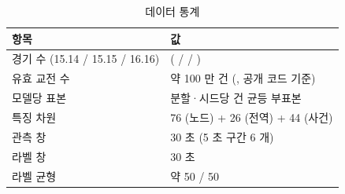 \begin{table}[htbp]
  \centering
  \caption{데이터 통계}
  \label{tab:data}
  \small
  \begin{tabular}{@{}ll@{}}
    \toprule
    항목 & 값 \\
    \midrule
    경기 수 (15.14 / 15.15 / 16.16) & \numMatches{} (\numMatchesPatchA{} / \numMatchesPatchB{} / \numMatchesPatchC{}) \\
    유효 교전 수 & 약 100 만 건 (\numEngagementsCorrected{}, 공개 코드 기준) \\
    모델당 표본 & 분할·시드당 \numSubsample{} 건 균등 부표본 \\
    특징 차원 & 76 (노드) + 26 (전역) + 44 (사건) \\
    관측 창 & 30 초 (5 초 구간 6 개) \\
    라벨 창 & 30 초 \\
    라벨 균형 & 약 50 / 50 \\
    \bottomrule
  \end{tabular}
\end{table}
